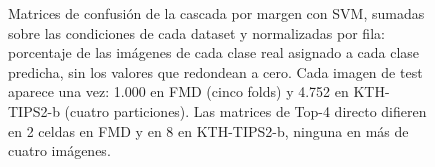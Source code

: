 \documentclass[a4paper,fleqn]{cas-sc}
\begin{document}
\begin{figure}[pos=htbp]
\caption{Matrices de confusión de la cascada por margen con SVM, sumadas sobre las condiciones de cada dataset y normalizadas por fila: porcentaje de las imágenes de cada clase real asignado a cada clase predicha, sin los valores que redondean a cero. Cada imagen de test aparece una vez: 1.000 en FMD (cinco folds) y 4.752 en KTH-TIPS2-b (cuatro particiones). Las matrices de Top-4 directo difieren en 2 celdas en FMD y en 8 en KTH-TIPS2-b, ninguna en más de cuatro imágenes.}
\label{fig:confusion}
\end{figure}
\end{document}
